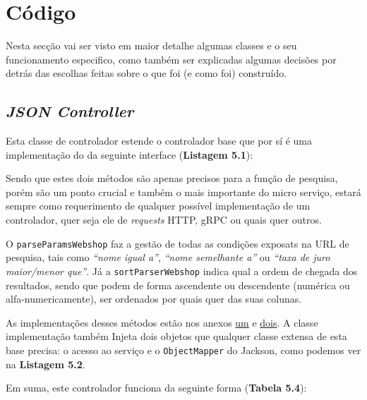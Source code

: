 \newpage

\section{Código}

Nesta secção vai ser visto em maior detalhe algumas classes e o seu funcionamento especifico, como também ser explicadas algumas decisões por detrás das escolhas feitas sobre o que foi (e como foi) construído.

\subsection{\textit{JSON Controller}}

Esta classe de controlador estende o controlador base que por sí é uma implementação do da seguinte interface (\textbf{Listagem 5.1}):



Sendo que estes dois métodos são apenas precisos para a função de pesquisa, porém são um ponto crucial e também o mais importante do micro serviço, estará sempre como requerimento de qualquer possível implementação de um controlador, quer seja ele de \textit{requests} HTTP, gRPC ou quais quer outros.

O \texttt{parseParamsWebshop} faz a gestão de todas as condições exposats na URL de pesquisa, tais como \textit{``nome igual a''}, \textit{``nome semelhante a''} ou \textit{``taxa de juro maior/menor que''}. Já a \texttt{sortParserWebshop} indica qual a ordem de chegada dos resultados, sendo que podem de forma ascendente ou descendente (numérica ou alfa-numericamente), ser ordenados por quais quer das suas colunas.

As implementações desses métodos estão nos anexos \hyperref[an1]{um} e \hyperref[an2]{dois}. A classe implementação também Injeta dois objetos que qualquer classe extensa de esta base precisa: o acesso ao serviço e o \texttt{ObjectMapper} do Jackson, como podemos ver na \textbf{Listagem 5.2}.



Em suma, este controlador funciona da seguinte forma (\textbf{Tabela 5.4}):

